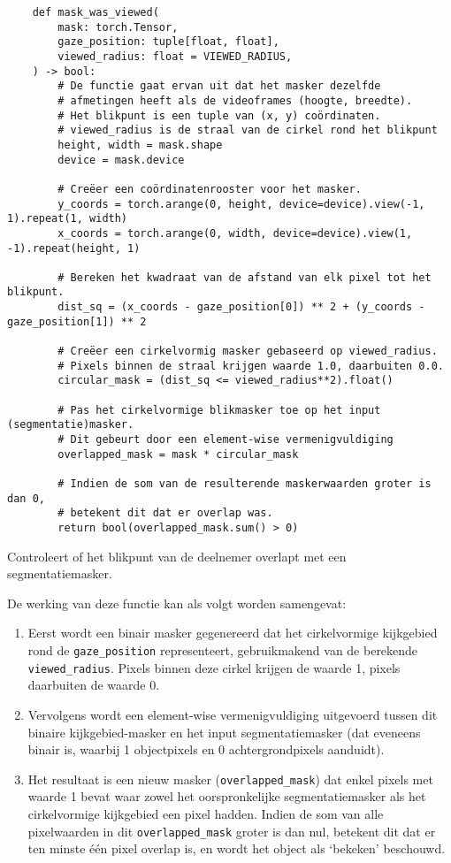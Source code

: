 \begin{listing}[H]
  \begin{verbatim}
    def mask_was_viewed(
        mask: torch.Tensor,
        gaze_position: tuple[float, float],
        viewed_radius: float = VIEWED_RADIUS,
    ) -> bool:
        # De functie gaat ervan uit dat het masker dezelfde
        # afmetingen heeft als de videoframes (hoogte, breedte).
        # Het blikpunt is een tuple van (x, y) coördinaten.
        # viewed_radius is de straal van de cirkel rond het blikpunt
        height, width = mask.shape
        device = mask.device

        # Creëer een coördinatenrooster voor het masker.
        y_coords = torch.arange(0, height, device=device).view(-1, 1).repeat(1, width)
        x_coords = torch.arange(0, width, device=device).view(1, -1).repeat(height, 1)

        # Bereken het kwadraat van de afstand van elk pixel tot het blikpunt.
        dist_sq = (x_coords - gaze_position[0]) ** 2 + (y_coords - gaze_position[1]) ** 2

        # Creëer een cirkelvormig masker gebaseerd op viewed_radius.
        # Pixels binnen de straal krijgen waarde 1.0, daarbuiten 0.0.
        circular_mask = (dist_sq <= viewed_radius**2).float()
        
        # Pas het cirkelvormige blikmasker toe op het input (segmentatie)masker.
        # Dit gebeurt door een element-wise vermenigvuldiging 
        overlapped_mask = mask * circular_mask

        # Indien de som van de resulterende maskerwaarden groter is dan 0,
        # betekent dit dat er overlap was.
        return bool(overlapped_mask.sum() > 0)

  \end{verbatim}
  \caption[\texttt{mask\_was\_viewed} functie]{
    Controleert of het blikpunt van de deelnemer overlapt met een segmentatiemasker.
  }
\end{listing}

De werking van deze functie kan als volgt worden samengevat:
\begin{enumerate}
  \item Eerst wordt een binair masker gegenereerd dat het cirkelvormige kijkgebied rond de \texttt{gaze\_position} representeert, 
  gebruikmakend van de berekende \texttt{viewed\_radius}. Pixels binnen deze cirkel krijgen de waarde 1, pixels daarbuiten de waarde 0.
  \item Vervolgens wordt een element-wise vermenigvuldiging uitgevoerd tussen dit binaire kijkgebied-masker 
  en het input segmentatiemasker (dat eveneens binair is, waarbij 1 objectpixels en 0 achtergrondpixels aanduidt). 
  \item Het resultaat is een nieuw masker (\texttt{overlapped\_mask}) dat enkel pixels met waarde 1 bevat waar 
  zowel het oorspronkelijke segmentatiemasker als het cirkelvormige kijkgebied een pixel hadden. 
  Indien de som van alle pixelwaarden in dit \texttt{overlapped\_mask} groter is dan nul, 
  betekent dit dat er ten minste één pixel overlap is, en wordt het object als `bekeken' beschouwd.
\end{enumerate}

